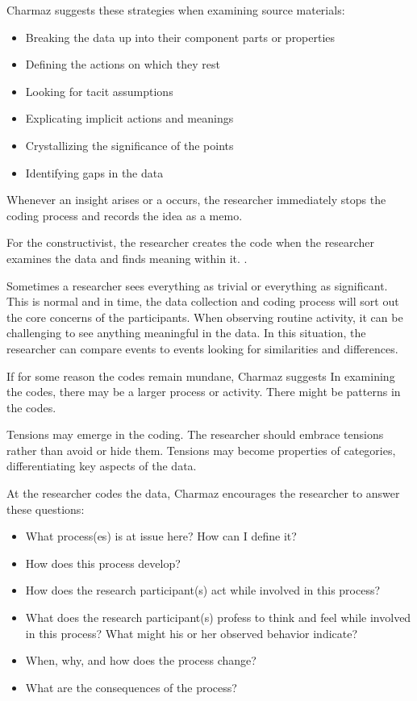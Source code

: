 Charmaz suggests these strategies when examining source materials:
\begin{itemize}
\item Breaking the data up into their component parts or properties
\item Defining the actions on which they rest
\item Looking for tacit assumptions
\item Explicating implicit actions and meanings
\item Crystallizing the significance of the points
\item Identifying gaps in the data \cite{Charmaz}
\end{itemize}

Whenever an insight arises or a  occurs, the researcher immediately stops the coding process and records the idea as a memo.

For the constructivist, the researcher creates the code when the researcher examines the data and finds meaning within it.  \cite{Charmaz}.

Sometimes a researcher sees everything as trivial or everything as significant. This is normal and in time, the data collection and coding process will sort out the core concerns of the participants. When observing routine activity, it can be challenging to see anything meaningful in the data. In this situation, the researcher can compare events to events looking for similarities and differences. 

If for some reason the codes remain mundane, Charmaz suggests  In examining the codes, there may be a larger process or activity. There might be patterns in the codes. 

Tensions may emerge in the coding. The researcher should embrace tensions rather than avoid or hide them. Tensions may become properties of categories, differentiating key aspects of the data.

At the researcher codes the data, Charmaz encourages the researcher to answer these questions:
\begin{itemize}
\item What process(es) is at issue here? How can I define it?
\item How does this process develop?
\item How does the research participant(s) act while involved in this process?
\item What does the research participant(s) profess to think and feel while involved in this process? What might his or her observed behavior indicate?
\item When, why, and how does the process change?
\item What are the consequences of the process? \cite{Charmaz}
\end{itemize}

